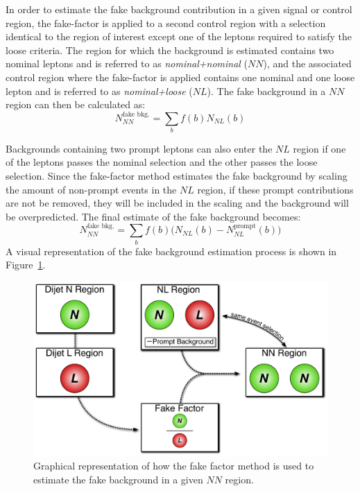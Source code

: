 In order to estimate the fake background contribution in a given signal or control region, the fake-factor is applied to a second control region with a selection identical to the region of interest except one of the leptons required to satisfy the loose criteria.
The region for which the background is estimated contains two nominal leptons and is referred to as \emph{nominal+nominal} ($NN$), and the associated control region where the fake-factor is applied contains one nominal and one loose lepton and is referred to as \emph{nominal+loose} ($NL$).
The fake background in a $NN$ region can then be calculated as:
\begin{equation}
N_{NN}^{\textrm{fake\ bkg.}} = \sum\limits_{b}f(b) N_{NL}(b)
\label{eq:ssww13tev_ff_bkg_nosub}
\end{equation}

Backgrounds containing two prompt leptons can also enter the $NL$ region if one of the leptons passes the nominal selection and the other passes the loose selection.
Since the fake-factor method estimates the fake background by scaling the amount of non-prompt events in the $NL$ region, if these prompt contributions are not be removed, they will be included in the scaling and the background will be overpredicted.
The final estimate of the fake background becomes:
\begin{equation}
N_{NN}^{\textrm{fake\ bkg.}} = \sum\limits_{b}f(b) \big(N_{NL}(b) - N_{NL}^{\textrm{prompt}}(b)\big)
\label{eq:ssww13tev_ff_bkg}
\end{equation}
A visual representation of the fake background estimation process is shown in Figure~\ref{fig:ssww13tev_ff_apply}.

\begin{figure}[htbp]
  \centering
  \includegraphics[width=.8\textwidth]{figs/ssww_13tev/backgrounds/ff/fake_factor}
  \caption{Graphical representation of how the fake factor method is used to estimate the fake background in a given $NN$ region.}
  \label{fig:ssww13tev_ff_apply}
\end{figure}

